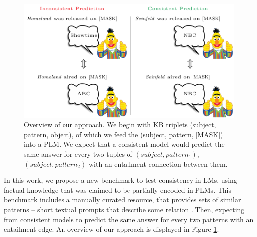 \begin{figure}[t!]
\centering

\includegraphics[width=1.\columnwidth]{figures/overview}

\caption{Overview of our approach. We begin with KB triplets (subject, pattern, object), of which we feed the (subject, pattern, [MASK]) into a PLM. 
We expect that a consistent model would predict the same answer for every two tuples of $(subject, pattern_1)$, $(subject, pattern_2)$ with an entailment connection between them.}
\label{fig:overview}
\end{figure}




In this work, we propose a new benchmark to test consistency in LMs, using factual knowledge that was claimed to be partially encoded in PLMs.
This benchmark includes a manually curated resource, that provides sets of similar patterns -- short textual prompts that describe some relation .
Then, expecting from consistent models to predict the same answer for every two patterns with an entailment edge. 
An overview of our approach is displayed in Figure \ref{fig:overview}.




